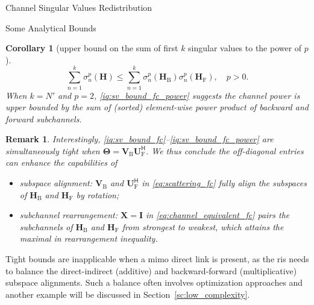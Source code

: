\documentclass[journal]{IEEEtran}
\newtheorem{remark}{Remark}
\newtheorem{corollary}{Corollary}[proposition]
\begin{document}
\begin{section}{Channel Singular Values Redistribution}
\begin{subsection}{Some Analytical Bounds}

		\begin{corollary}[upper bound on the sum of first $k$ singular values to the power of $p$]
			\begin{equation}
				\sum_{n=1}^k \sigma_n^p(\mathbf{H}) \le \sum_{n=1}^k \sigma_n^p(\mathbf{H}_\mathrm{B}) \sigma_n^p(\mathbf{H}_\mathrm{F}), \quad p > 0.
				\label{iq:sv_bound_fc_power}
			\end{equation}
			When $k = N'$ and $p = 2$, \eqref{iq:sv_bound_fc_power} suggests the channel power is upper bounded by the sum of (sorted) element-wise power product of backward and forward subchannels.
		\end{corollary}

		\begin{remark}
			Interestingly, \eqref{iq:sv_bound_fc}--\eqref{iq:sv_bound_fc_power} are simultaneously tight when $\mathbf{\Theta} = \mathbf{V}_\mathrm{B} \mathbf{U}_\mathrm{F}^\mathsf{H}$.
			We thus conclude the off-diagonal entries can enhance the capabilities of
			\begin{itemize}
				\item subspace alignment: $\mathbf{V}_\mathrm{B}$ and $\mathbf{U}_\mathrm{F}^\mathsf{H}$ in \eqref{eq:scattering_fc} fully align the subspaces of $\mathbf{H}_\mathrm{B}$ and $\mathbf{H}_\mathrm{F}$ by rotation;
				\item subchannel rearrangement: $\mathbf{X} = \mathbf{I}$ in \eqref{eq:channel_equivalent_fc} pairs the subchannels of $\mathbf{H}_\mathrm{B}$ and $\mathbf{H}_\mathrm{F}$ from strongest to weakest, which attains the maximal in rearrangement inequality.
			\end{itemize}
		\end{remark}

		Tight bounds are inapplicable when a \gls{mimo} direct link is present, as the \gls{ris} needs to balance the direct-indirect (additive) and backward-forward (multiplicative) subspace alignments.
		Such a balance often involves optimization approaches and another example will be discussed in Section~\ref{sc:low_complexity}.
	\end{subsection}

\end{section}
\end{document}
